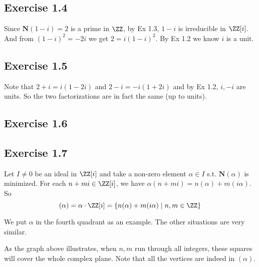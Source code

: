 \documentclass[../Chapter.tex]{subfiles}
\begin{document}
\subsection*{Exercise 1.4}

Since $\mathbf{N}(1-i)=2$ is a prime in $\ZZ$, by Ex 1.3, $1-i$ is irreducible in $\ZZ[i]$. And from $(1-i)^2=-2i$ we get $2=i(1-i)^2$. By Ex 1.2 we know $i$ is a unit.

\subsection*{Exercise 1.5}

Note that $2+i=i(1-2i)$ and $2-i=-i(1+2i)$ and by Ex 1.2, $i,-i$ are units. So the two factorizations are in fact the same (up to units).

\subsection*{Exercise 1.6}

\subsection*{Exercise 1.7}
Let $I\neq 0$ be an ideal in $\ZZ[i]$ and take a non-zero element $\alpha\in I$ s.t. $\mathbf{N}(\alpha)$ is minimized. For each $n+mi\in\ZZ[i]$, we have $\alpha(n+mi)=n(\alpha)+m(i\alpha)$. So $$(\alpha)=\alpha\cdot\ZZ[i]=\{n(\alpha)+m(i\alpha)\mid n,m\in\ZZ\}$$

We put $\alpha$ in the fourth quadrant as an example. The other situations are very similar.

\begin{center}
\end{center}
As the graph above illustrates, when $n,m$ run through all integers, these squares will cover the whole complex plane. Note that all the vertices are indeed in $(\alpha)$.
\end{document}
